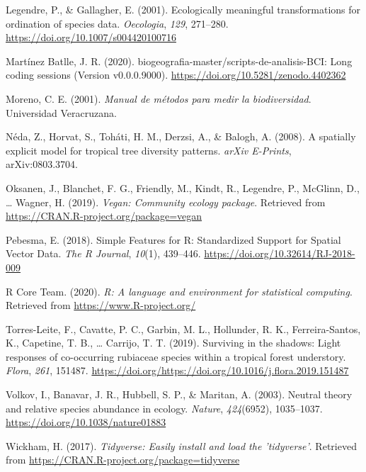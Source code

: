 \documentclass[11pt,]{article}
\begin{document}
\hypertarget{ref-legendre_galllagher_2001}{}
Legendre, P., \& Gallagher, E. (2001). Ecologically meaningful
transformations for ordination of species data. \emph{Oecologia},
\emph{129}, 271--280. \url{https://doi.org/10.1007/s004420100716}

\hypertarget{ref-jose_ramon_martinez_batlle_2020_4402362}{}
Martínez Batlle, J. R. (2020).
biogeografia-master/scripts-de-analisis-BCI: Long coding sessions
(Version v0.0.0.9000). \url{https://doi.org/10.5281/zenodo.4402362}

\hypertarget{ref-moreno2001manual}{}
Moreno, C. E. (2001). \emph{Manual de métodos para medir la
biodiversidad}. Universidad Veracruzana.

\hypertarget{ref-2008arXiv0803.3704N}{}
Néda, Z., Horvat, S., Toháti, H. M., Derzsi, A., \& Balogh, A. (2008). A
spatially explicit model for tropical tree diversity patterns.
\emph{arXiv E-Prints}, arXiv:0803.3704.

\hypertarget{ref-cita_vegan}{}
Oksanen, J., Blanchet, F. G., Friendly, M., Kindt, R., Legendre, P.,
McGlinn, D., \ldots{} Wagner, H. (2019). \emph{Vegan: Community ecology
package}. Retrieved from \url{https://CRAN.R-project.org/package=vegan}

\hypertarget{ref-cita_sf}{}
Pebesma, E. (2018). Simple Features for R: Standardized Support for
Spatial Vector Data. \emph{The R Journal}, \emph{10}(1), 439--446.
\url{https://doi.org/10.32614/RJ-2018-009}

\hypertarget{ref-cita_r}{}
R Core Team. (2020). \emph{R: A language and environment for statistical
computing}. Retrieved from \url{https://www.R-project.org/}

\hypertarget{ref-TORRESLEITE2019151487}{}
Torres-Leite, F., Cavatte, P. C., Garbin, M. L., Hollunder, R. K.,
Ferreira-Santos, K., Capetine, T. B., \ldots{} Carrijo, T. T. (2019).
Surviving in the shadows: Light responses of co-occurring rubiaceae
species within a tropical forest understory. \emph{Flora}, \emph{261},
151487.
\url{https://doi.org/https://doi.org/10.1016/j.flora.2019.151487}

\hypertarget{ref-Volkov_2003}{}
Volkov, I., Banavar, J. R., Hubbell, S. P., \& Maritan, A. (2003).
Neutral theory and relative species abundance in ecology. \emph{Nature},
\emph{424}(6952), 1035--1037. \url{https://doi.org/10.1038/nature01883}

\hypertarget{ref-cita_tidyverse}{}
Wickham, H. (2017). \emph{Tidyverse: Easily install and load the
'tidyverse'}. Retrieved from
\url{https://CRAN.R-project.org/package=tidyverse}




\newpage
\singlespacing 
\end{document}
